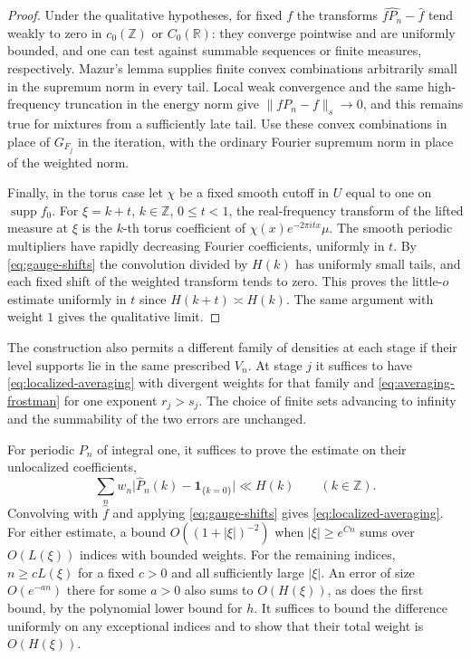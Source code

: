 \documentclass[11pt,a4paper,reqno]{amsart}
\theoremstyle{definition}
\theoremstyle{remark}
\numberwithin{equation}{section}
\begin{document}
\begin{proof}
Under the qualitative hypotheses, for fixed \(f\) the transforms \(\widehat{fP_n}-\widehat f\) tend weakly to zero in \(c_0(\mathbb Z)\) or \(C_0(\mathbb R)\): they converge pointwise and are uniformly bounded, and one can test against summable sequences or finite measures, respectively. Mazur's lemma supplies finite convex combinations arbitrarily small in the supremum norm in every tail. Local weak convergence and the same high-frequency truncation in the energy norm give \(\|fP_n-f\|_s\to0\), and this remains true for mixtures from a sufficiently late tail. Use these convex combinations in place of \(G_{F_j}\) in the iteration, with the ordinary Fourier supremum norm in place of the weighted norm.

Finally, in the torus case let \(\chi\) be a fixed smooth cutoff in \(U\) equal to one on \(\operatorname{supp} f_0\). For \(\xi=k+t\), \(k\in\mathbb Z\), \(0\le t<1\), the real-frequency transform of the lifted measure at \(\xi\) is the \(k\)-th torus coefficient of \(\chi(x)e^{-2\pi i t x}\mu\). The smooth periodic multipliers have rapidly decreasing Fourier coefficients, uniformly in \(t\). By \eqref{eq:gauge-shifts} the convolution divided by \(H(k)\) has uniformly small tails, and each fixed shift of the weighted transform tends to zero. This proves the little-\(o\) estimate uniformly in \(t\) since \(H(k+t)\asymp H(k)\). The same argument with weight \(1\) gives the qualitative limit.
\end{proof}

The construction also permits a different family of densities at each stage if their level supports lie in the same prescribed \(V_n\). At stage \(j\) it suffices to have \eqref{eq:localized-averaging} with divergent weights for that family and \eqref{eq:averaging-frostman} for one exponent \(r_j>s_j\). The choice of finite sets advancing to infinity and the summability of the two errors are unchanged.

For periodic \(P_n\) of integral one, it suffices to prove the estimate on their unlocalized coefficients,
\begin{equation}\label{eq:unlocalized-averaging}
 \sum_n w_n\big|\widehat P_n(k)-\mathbf 1_{\{k=0\}}\big|\ll H(k)
 \qquad(k\in\mathbb Z).
\end{equation}
Convolving with \(\widehat f\) and applying \eqref{eq:gauge-shifts} gives \eqref{eq:localized-averaging}. For either estimate, a bound \(O((1+|\xi|)^{-2})\) when \(|\xi|\ge e^{Cn}\) sums over \(O(L(\xi))\) indices with bounded weights. For the remaining indices, \(n\ge cL(\xi)\) for a fixed \(c>0\) and all sufficiently large \(|\xi|\). An error of size \(O(e^{-an})\) there for some \(a>0\) also sums to \(O(H(\xi))\), as does the first bound, by the polynomial lower bound for \(h\). It suffices to bound the difference uniformly on any exceptional indices and to show that their total weight is \(O(H(\xi))\).
\end{document}
